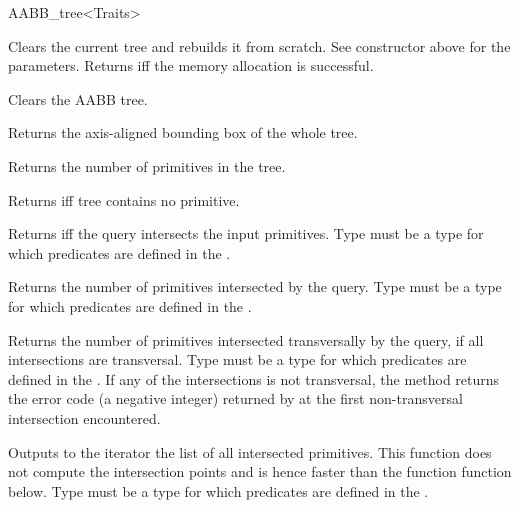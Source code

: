\begin{ccRefClass}{AABB_tree<Traits>}
\ccOperations

{Clears the current tree and rebuilds it from scratch. See constructor above for the parameters. Returns  iff the memory allocation is successful. }

{Clears the AABB tree. }

{Returns the axis-aligned bounding box of the whole tree. }

{Returns the number of primitives in the tree. }

{Returns  iff tree contains no primitive. }


{ Returns  iff the query intersects the input primitives. Type  must be a type for which  predicates are defined in the .}
	
{Returns the number of primitives intersected by the query. Type  must be a type for which  predicates are defined in the .}

{Returns the number of primitives intersected transversally by the query, if all intersections are transversal. Type  must be a type for which  predicates are defined in the . If any of the intersections is not transversal, the method returns the error code (a negative integer) returned by  at the first non-transversal intersection encountered.}

{Outputs to the iterator the list of all intersected primitives. This function does not compute the intersection points and is hence faster than the function  function below. Type  must be a type for which  predicates are defined in the .}


\end{ccRefClass}
